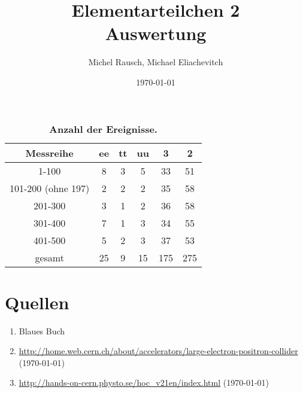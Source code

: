 \documentclass[a4paper,ngerman]{scrartcl}
\title{Elementarteilchen 2\\Auswertung}
\date{\today}
\author{Michel Rausch, Michael Eliachevitch}
\begin{document}
\maketitle
\tableofcontents
\newpage

\begin{table}
\centering
\caption{\textbf{Anzahl der Ereignisse.}}
\begin{tabular}{cccccc}
\toprule
Messreihe			&	ee	&	tt	&	uu	&	3	&	2	\\
\midrule
1-100				& 	8	&	3	&	5	&	33	&	51	\\
101-200 (ohne 197)	& 	2	&	2	&	2	&	35	&	58	\\
201-300				&	3	&	1	&	2	&	36	&	58	\\
301-400				&	7	&	1	&	3	&	34	&	55	\\
401-500				&	5	&	2	&	3	&	37	&	53	\\
gesamt				&	25	&	9	&	15	&	175	&	275	\\
\bottomrule
\end{tabular}
\label{tab:count}
\end{table}



\section{Quellen}
\begin{enumerate}
\item Blaues Buch \label{ref:BB}
\item \url{http://home.web.cern.ch/about/accelerators/large-electron-positron-collider}
 (\today) \label{ref:cernlep}
\item \url{http://hands-on-cern.physto.se/hoc_v21en/index.html} (\today)\label{ref:hands-on}
\end{enumerate}
\end{document}
